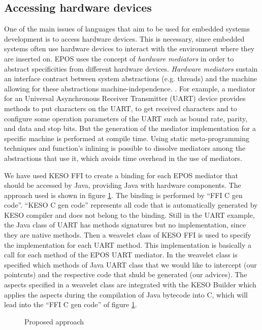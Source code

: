 \documentclass[12pt]{article} %
\newcommand{\fig}[4][htb]{
  \begin{figure}[#1] {\centering\scalebox{#2}{\texttt{[image: fig/\#3]}}\par}
    \caption{#4\label{fig:#3}}
  \end{figure}
}
\begin{document}
\subsection{Accessing hardware devices}
One of the main issues of languages that aim to be used for embedded systems development is to access hardware devices. This is necessary, since embedded systems often use hardware devices to interact with the environment where they are inserted on. EPOS uses the concept of \emph{hardware mediators} in order to abstract specificities from different hardware devices. \emph{Hardware mediators} sustain an interface contract between system abstractions (e.g. threads) and the machine allowing for these abstractions machine-independence. \cite{Polpeta:2004}. For example, a mediator for an Universal Asynchronous Receiver Transmitter (UART) device provides methods to put characters on the UART, to get received characters and to configure some operation parameters of the UART such as bound rate, parity, and data and stop bits. But the generation of the mediator implementation for a specific machine is performed at compile time. Using static meta-programming techniques and function's inlining is possible to dissolve mediators among the abstractions that use it, which avoids time overhead in the use of mediators.

We have used KESO FFI to create a binding for each EPOS mediator that should be accessed by Java, providing Java with hardware components. The approach used is shown in figure \ref{fig:approach_v02}. The binding is performed by ``FFI C gen code''. ``KESO C gen code'' represents all code that is automatically generated by KESO compiler and does not belong to the binding. Still in the UART example, the Java class of UART has methods signatures but no implementation, since they are native methods. Then a weavelet class of KESO FFI is used to specify the implementation for each UART method. This implementation is basically a call for each method of the EPOS UART mediator. In the weavelet class is specified which methods of Java UART class that we would like to intercept (our pointcuts) and the respective code that shuld be generated (our advices). The aspects specified in a weavelet class are integrated with the KESO Builder which applies the aspects during the compilation of Java bytecode into C, which will lead into the ``FFI C gen code'' of figure \ref{fig:approach_v02}.

\fig{.3}{approach_v02}{Proposed approach}
\end{document}
